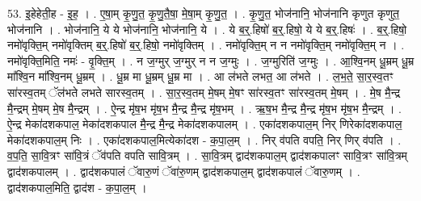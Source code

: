 \documentclass[17pt]{extarticle}
\begin{document}
53. इ॒हेहेती॒ह - इ॒ह॒ । . ए॒षा॒म् कृ॒णु॒त॒ कृ॒णु॒तै॒षा॒ मे॒षा॒म् कृ॒णु॒त॒ । . कृ॒णु॒त॒ भोज॑नानि॒ भोज॑नानि कृणुत कृणुत॒ भोज॑नानि । . भोज॑नानि॒ ये ये भोज॑नानि॒ भोज॑नानि॒ ये । . ये ब॒र्॒.हिषो॑ ब॒र्॒.हिषो॒ ये ये ब॒र्॒.हिषः॑ । . ब॒र्॒.हिषो॒ नमो॑वृक्ति॒म् नमो॑वृक्तिम् ब॒र्॒.हिषो॑ ब॒र्॒.हिषो॒ नमो॑वृक्तिम् । . नमो॑वृक्ति॒म् न न नमो॑वृक्ति॒म् नमो॑वृक्ति॒म् न । . नमो॑वृक्ति॒मिति॒ नमः॑ - वृ॒क्ति॒म् । . न ज॒ग्मुर् ज॒ग्मुर् न न ज॒ग्मुः । . ज॒ग्मुरिति॑ ज॒ग्मुः । . आ॒श्वि॒नम् धू॒म्रम् धू॒म्र मा᳚श्वि॒न मा᳚श्वि॒नम् धू॒म्रम् । . धू॒म्र मा धू॒म्रम् धू॒म्र मा । . आ ल॑भते लभत॒ आ ल॑भते । . ल॒भ॒ते॒ सा॒र॒स्व॒तꣳ सा॑रस्व॒तम् ॅल॑भते लभते सारस्व॒तम् । . सा॒र॒स्व॒तम् मे॒षम् मे॒षꣳ सा॑रस्व॒तꣳ सा॑रस्व॒तम् मे॒षम् । . मे॒ष मै॒न्द्र मै॒न्द्रम् मे॒षम् मे॒ष मै॒न्द्रम् । . ऐ॒न्द्र मृ॑ष॒भ मृ॑ष॒भ मै॒न्द्र मै॒न्द्र मृ॑ष॒भम् । . ऋ॒ष॒भ मै॒न्द्र मै॒न्द्र मृ॑ष॒भ मृ॑ष॒भ मै॒न्द्रम् । . ऐ॒न्द्र मेका॑दशकपाल॒ मेका॑दशकपाल मै॒न्द्र मै॒न्द्र मेका॑दशकपालम् । . एका॑दशकपाल॒म् निर् णिरेका॑दशकपाल॒ मेका॑दशकपाल॒म् निः । . एका॑दशकपाल॒मित्येका॑दश - क॒पा॒ल॒म् । . निर् व॑पति वपति॒ निर् णिर् व॑पति । . व॒प॒ति॒ सा॒वि॒त्रꣳ सा॑वि॒त्रं ॅव॑पति वपति सावि॒त्रम् । . सा॒वि॒त्रम् द्वाद॑शकपाल॒म् द्वाद॑शकपालꣳ सावि॒त्रꣳ सा॑वि॒त्रम् द्वाद॑शकपालम् । . द्वाद॑शकपालं ॅवारु॒णं ॅवा॑रु॒णम् द्वाद॑शकपाल॒म् द्वाद॑शकपालं ॅवारु॒णम् । . द्वाद॑शकपाल॒मिति॒ द्वाद॑श - क॒पा॒ल॒म् । \newline
\end{document}
